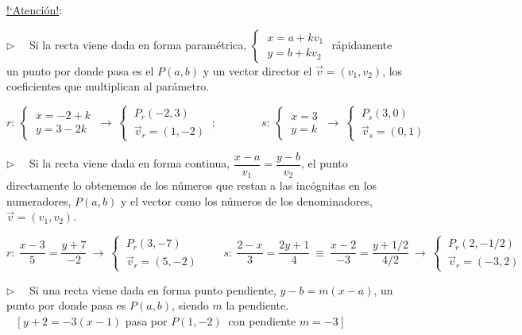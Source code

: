 \begin{cuadro-naranja}
\underline{!`Atención!}:

$\triangleright \quad $ Si la recta viene dada en forma paramétrica, $\begin{cases} \ x=a+kv_1\\ \ y=b+kv_2 \end{cases} $ rápidamente un punto por donde pasa es el $P(a,b)$ y un vector director el $\vec v=(v_1,v_2)$, los coeficientes que multiplican al parámetro.	

$r: \ \begin{cases} \ x=-2+k \\ \ y=3-2k \end{cases} \ \to \ \begin{cases} \ P_r(-2,3) \\ \ \vec v_r=(1,-2) \end{cases}\ ; \qquad \qquad 
s: \ \begin{cases} \ x=3 \\ \ y=k \end{cases} \ \to \ \begin{cases} \ P_s(3,0) \\ \ \vec v_s=(0,1) \end{cases}$

\vspace{4mm} $\triangleright \quad $ Si la recta viene dada en forma continua, $\dfrac{x-a}{v_1}=\dfrac{y-b}{v_2}$, el punto directamente lo obtenemos de los números que restan a las incógnitas en los numeradores, $P(a,b)$ y el vector como los números de los denominadores, $\vec v=(v_1,v_2)$.

\begin{small}
$r:\ \dfrac{x-3}{5}=\dfrac{y+7}{-2} \ \to \ \begin{cases} \ P_r(3,-7) \\ \ \vec v_r=(5,-2) \end{cases}  \qquad   s:\ \dfrac{2-x}{3}=\dfrac{2y+1}{4} \ \equiv \  \dfrac{x-2}{-3}=\dfrac{y+1/2}{4/2} \ \to \ \begin{cases} \ P_r(2,-1/2) \\ \ \vec v_r=(-3,2) \end{cases}$ \end{small}

\vspace{4mm} $\triangleright \quad $ Si una recta viene dada en forma punto pendiente, $y-b=m(x-a)$, un punto por donde pasa es $P(a,b)$, siendo $m$ la pendiente. $\quad [ \ y+2=-3(x-1)$ pasa por $P(1,-2) \ $ con pendiente $m=-3\ ]$



\end{cuadro-naranja}
